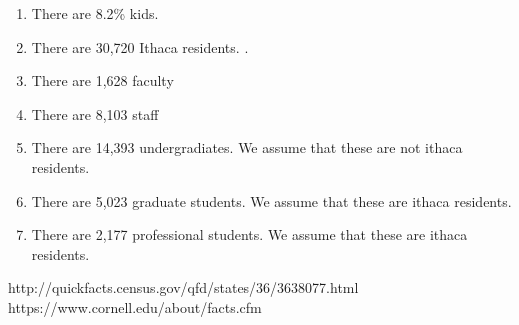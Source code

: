 \documentclass{article}
\begin{document}
\begin{enumerate}
\item There are 8.2\% kids\cite{census}.
\item There are 30,720 Ithaca residents. \cite{census}.
\item There are 1,628 faculty \cite{cornellpop}
\item There are 8,103 staff \cite{cornellpop}
\item There are 14,393 undergradiates.  We assume that 
	these are not ithaca residents. \cite{cornellpop}
\item There are 5,023 graduate students. We assume that these
	are ithaca residents. \cite{cornellpop}
\item There are 2,177 professional students.  We assume that
	these are ithaca residents.  \cite{cornellpop}
\end{enumerate}

\begin{thebibliography}{9}
	http://quickfacts.census.gov/qfd/states/36/3638077.html
	https://www.cornell.edu/about/facts.cfm
\end{thebibliography}
\end{document}
